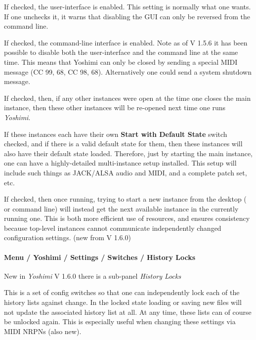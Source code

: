    If checked, the user-interface is enabled.  This setting is normally what one
   wants.  If one unchecks it, it warns that disabling the GUI
   can only be reversed from the command line.

   If checked, the command-line interface is enabled.
   Note as of V 1.5.6 it has been possible to disable both the user-interface and
   the command line at the same time. This means that Yoshimi can only be closed
   by sending a special MIDI message (CC 99, 68, CC 98, 68). Alternatively one
   could send a system shutdown message.

      If checked, then, if any other instances were open at the time one closes
      the main instance, then these other instances will be re-opened next time
      one runs \textsl{Yoshimi}.

   If these instances each have their own
   \textbf{Start with Default State} switch checked, and if
   there is a valid default state for them, then these instances will also have
   their default state loaded.
   Therefore, just by starting the main instance, one can have a
   highly-detailed multi-instance setup installed.
   This setup will include such things as JACK/ALSA audio
   and MIDI, and a complete patch set, etc.

      If checked, then once running, trying to start a new instance from the
      desktop ( or command line) will instead get the next available instance in
      the currently running one. This is both more efficient use of resources,
      and ensures consistency because top-level instances cannot communicate
      independently changed configuration settings. (new from V 1.6.0)

   \paragraph{Menu / Yoshimi / Settings / Switches / History Locks}
   \label{paragraph:menu_yoshimi_settings_historylocks}
   New in \textsl{Yoshimi} V 1.6.0 there is a sub-panel \textsl{History Locks}

   This is a set of config switches so that one can independently lock each of
   the history lists against change. In the locked state loading or saving new
   files will not update the associated history list at all. At any time, these
   lists can of course be unlocked again. This is especially useful when changing
   these settings via MIDI NRPNs (also new).

